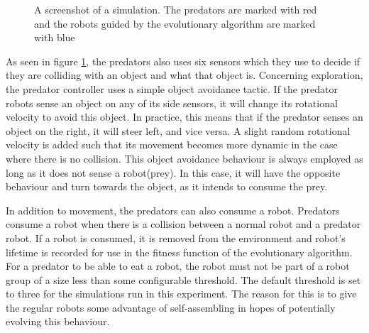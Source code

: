 \begin{figure}[H]
	\centering
	\caption{A screenshot of a simulation. The predators are marked with red and the robots guided by the evolutionary algorithm are marked with blue}
	\label{fig:predator_screendump}
\end{figure}

As seen in figure \ref{fig:predator_screendump}, the predators also uses six sensors which they use to decide if they are colliding with an object and what that object is.    
Concerning exploration, the predator controller uses a simple object avoidance tactic.
If the predator robots sense an object on any of its side sensors, it will change its rotational velocity to avoid this object.
In practice, this means that if the predator senses an object on the right, it will steer left, and vice versa.
A slight random rotational velocity is added such that its movement becomes more dynamic in the case where there is no collision.
This object avoidance behaviour is always employed as long as it does not sense a robot(prey).
In this case, it will have the opposite behaviour and turn towards the object, as it intends to consume the prey.

In addition to movement, the predators can also consume a robot. 
Predators consume a robot when there is a collision between a normal robot and a predator robot.
If a robot is consumed, it is removed from the environment and robot's lifetime is recorded for use in the fitness function of the evolutionary algorithm. 
For a predator to be able to eat a robot, the robot must not be part of a robot group of a size less than some configurable threshold.
The default threshold is set to three for the simulations run in this experiment.
The reason for this is to give the regular robots some advantage of self-assembling in hopes of potentially evolving this behaviour. 

